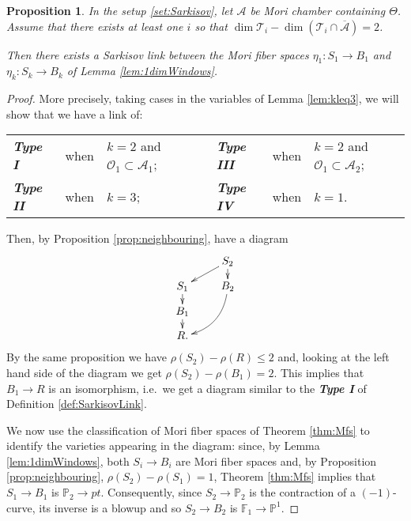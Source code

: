 \documentclass[a4paper,11pt]{amsart}
\newtheorem{proposition}[theorem]{Proposition}
\def\dim{\operatorname{dim}}
\newcommand{\OO}{\mathcal{O}}
\newcommand{\Aa}{\mathcal{A}}
\newcommand{\Tt}{\mathcal{T}}
\newcommand{\PP}{\mathbb{P}}
\renewcommand{\FF}{\mathbb{F}}
\begin{document}
\begin{proposition}\label{prop:SarkisovLink}
	In the setup \ref{set:Sarkisov}, let $\Aa$ be Mori chamber containing $\Theta$.
	Assume that there exists at least one $i$ so that $\dim\Tt_i - \dim(\Tt_i \cap \overline{\Aa}) = 2$.
	
	Then there exists a Sarkisov link between the Mori fiber spaces $\eta_1\colon S_1 \to B_1$ and $\eta_k\colon S_k \to B_k$ of Lemma \ref{lem:1dimWindows}.
\end{proposition}

\begin{proof}
	More precisely, taking cases in the variables of Lemma \ref{lem:kleq3}, we will show that we have a link of:
	
	\begin{tabular}{lclclcl}
		\emph{\textbf{Type I}}  &when &$k = 2$ and $\OO_1 \subset \Aa_1$;& & \emph{\textbf{Type III}}&when &$k = 2$ and $\OO_1 \subset \Aa_2$;\\
		\emph{\textbf{Type II}} &when &$k=3$;& &\emph{\textbf{Type IV}} &when &$k=1$.\\		
	\end{tabular}
	
	\noindent\fbox{Case: $k=2$ and $\OO_1 \subset \Aa_1$}
	
	\noindent
	Then, by Proposition \ref{prop:neighbouring}, have a diagram
	\[
	\xymatrix@R=.3cm@C=.3cm{
				&& S_2 \ar[d] \ar[lld]\\
	S_1\ar[d] 	&& B_2 \ar@/^1pc/[lldd]\\
	B_1\ar[d]\\
	R.	}
	\]
	By the same proposition we have $\rho(S_2) - \rho(R) \leq 2$ and, looking at the left hand side of the diagram we get $\rho(S_2) - \rho(B_1) = 2$.
	This implies that $B_1 \to R$ is an isomorphism, i.e.\ we get a diagram similar to the \emph{\textbf{Type I}} of Definition \ref{def:SarkisovLink}.
	
	We now use the classification of Mori fiber spaces of Theorem \ref{thm:Mfs} to identify the varieties appearing in the diagram:
	since, by Lemma \ref{lem:1dimWindows}, both $S_i \to B_i$ are Mori fiber spaces and, by Proposition \ref{prop:neighbouring}, $\rho(S_2) - \rho(S_1) = 1$, Theorem \ref{thm:Mfs} implies that $S_1 \to B_1$ is $\PP_2 \to pt$.
	Consequently, since $S_2 \to \PP_2$ is the contraction of a $(-1)$-curve, its inverse is a blowup and so $S_2 \to B_2$ is $\FF_1 \to \PP^1$.
	
	\noindent{}
	

\end{proof}
\end{document}
